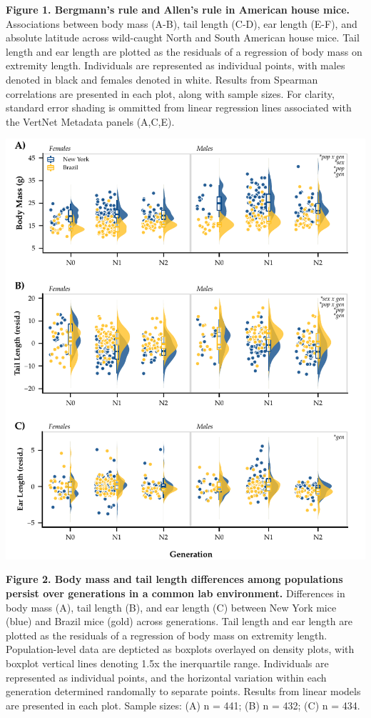 \documentclass[]{article}
\begin{document}
\textbf{Figure 1. Bergmann's rule and Allen's rule in American house
mice.} Associations between body mass (A-B), tail length (C-D), ear
length (E-F), and absolute latitude across wild-caught North and South
American house mice. Tail length and ear length are plotted as the
residuals of a regression of body mass on extremity length. Individuals
are represented as individual points, with males denoted in black and
females denoted in white. Results from Spearman correlations are
presented in each plot, along with sample sizes. For clarity, standard
error shading is ommitted from linear regression lines associated with
the VertNet Metadata panels (A,C,E).

\newpage

\includegraphics{../results/figures/Generations_colony.pdf}

\textbf{Figure 2. Body mass and tail length differences among
populations persist over generations in a common lab environment.}
Differences in body mass (A), tail length (B), and ear length (C)
between New York mice (blue) and Brazil mice (gold) across generations.
Tail length and ear length are plotted as the residuals of a regression
of body mass on extremity length. Population-level data are depticted as
boxplots overlayed on density plots, with boxplot vertical lines
denoting 1.5x the inerquartile range. Individuals are represented as
individual points, and the horizontal variation within each generation
determined randomally to separate points. Results from linear models are
presented in each plot. Sample sizes: (A) n = 441; (B) n = 432; (C) n =
434.
\end{document}
